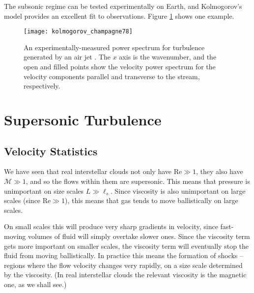 The subsonic regime can be tested experimentally on Earth, and Kolmogorov's model provides an excellent fit to observations. Figure \ref{fig:kolmogorov} shows one example.

\begin{figure}
\texttt{[image: kolmogorov\_champagne78]}
\caption[Experimental power spectra for Kolmogorov turbulence]{
\label{fig:kolmogorov}
An experimentally-measured power spectrum for turbulence generated by an air jet \citep{champagne78a}. The $x$ axis is the wavenumber, and the open and filled points show the velocity power spectrum for the velocity components parallel and transverse to the stream, respectively.
}
\end{figure}

\section{Supersonic Turbulence}

\subsection{Velocity Statistics}

We have seen that real interstellar clouds not only have $\mathrm{Re} \gg 1$, they also have $\mathcal{M} \gg 1$, and so the flows within them are supersonic. This means that pressure is unimportant on size scales $L \gg \ell_s$. Since viscosity is also unimportant on large scales (since $\mbox{Re} \gg 1$), this means that gas tends to move ballistically on large scales.

On small scales this will produce very sharp gradients in velocity, since fast-moving volumes of fluid will simply overtake slower ones. Since the viscosity term gets more important on smaller scales, the viscosity term will eventually stop the fluid from moving ballistically. In practice this means the formation of shocks -- regions where the flow velocity changes very rapidly, on a size scale determined by the viscosity. (In real interstellar clouds the relevant viscosity is the magnetic one, as we shall see.)

